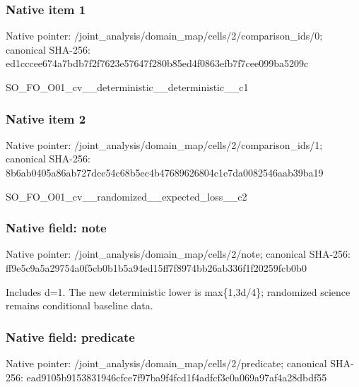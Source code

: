 \documentclass[10pt,a4paper]{article}
\begin{document}
\subsubsection{Native item 1}
Native pointer: /joint\_\allowbreak{}analysis/domain\_\allowbreak{}map/cells/2/comparison\_\allowbreak{}ids/0; canonical SHA-256: ed1cccee674a7bdb7f2f7623e57647f280b85ed4f0863efb7f7cee099ba5209c

\begingroup\raggedright\sloppy SO\_\allowbreak{}FO\_\allowbreak{}O01\_\allowbreak{}cv\_\allowbreak{}\_\allowbreak{}deterministic\_\allowbreak{}\_\allowbreak{}deterministic\_\allowbreak{}\_\allowbreak{}c1\par\endgroup

\subsubsection{Native item 2}
Native pointer: /joint\_\allowbreak{}analysis/domain\_\allowbreak{}map/cells/2/comparison\_\allowbreak{}ids/1; canonical SHA-256: 8b6ab0405a86ab727dce54c68b5ec4b47689626804c1e7da0082546aab39ba19

\begingroup\raggedright\sloppy SO\_\allowbreak{}FO\_\allowbreak{}O01\_\allowbreak{}cv\_\allowbreak{}\_\allowbreak{}randomized\_\allowbreak{}\_\allowbreak{}expected\_\allowbreak{}loss\_\allowbreak{}\_\allowbreak{}c2\par\endgroup

\subsubsection{Native field: note}
Native pointer: /joint\_\allowbreak{}analysis/domain\_\allowbreak{}map/cells/2/note; canonical SHA-256: ff9e5c9a5a29754a0f5cb0b1b5a94ed15ff7f8974bb26ab336f1f20259fcb0b0

\begingroup\raggedright\sloppy Includes d=\allowbreak{}1. The new deterministic lower is max\{1,\allowbreak{}3d/\allowbreak{}4\};\allowbreak{} randomized science remains conditional baseline data.\par\endgroup

\subsubsection{Native field: predicate}
Native pointer: /joint\_\allowbreak{}analysis/domain\_\allowbreak{}map/cells/2/predicate; canonical SHA-256: ead9105b9153831946cfce7f97ba9f4fcd1f4adfcf3c0a069a97af4a28dbdf55
\end{document}
